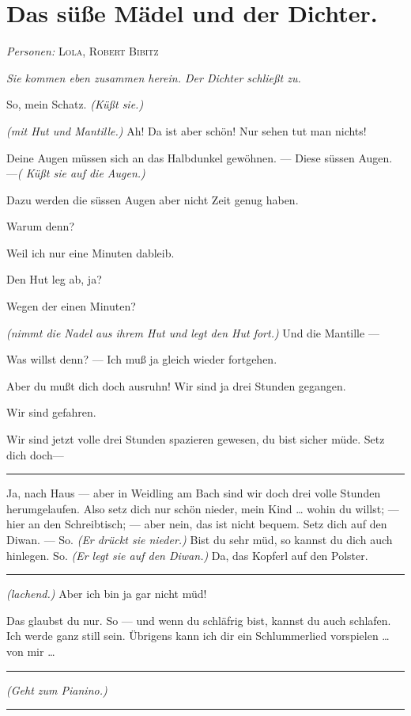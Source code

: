 \documentclass[
	final,
	a4paper,
	ngerman,
	mpinclude = true, %
	twoside = true,
	open = right,
	cleardoublepage = plain,
	DIV = 13,
	BCOR = 1cm,
	titlepage = firstiscover,
	]{scrbook}
\newcommand{\scene}{\section}
\newcommand{\direction}[1]{\textit{(#1)}}
\newcommand{\setting}[1]{\vspace{-0.5\baselineskip}\centering\textit{#1}}
\newenvironment{deletion}{%
		\vspace{0.25\baselineskip}
		\hrule
		\vspace{0.25\baselineskip}
		\color{darkgray}
	}{
		\color{black}
		\vspace{0.25\baselineskip}
		\hrule 
		\vspace{0.25\baselineskip}
	}
\newcommand{\characterlist}[1]{{\begin{center}\textit{Personen:} #1\end{center}}}
\newcommand{\thecharacter}[1]{\textup{\textsc{#1}}\xspace}
\newcommand{\thesuesse}{\thecharacter{Lola}}
\newcommand{\thedichter}{\thecharacter{Robert Bibitz}}
\newcommand{\character}[1]{\item[#1:]}
\newcommand{\suesse}{\character{\thesuesse}}
\newcommand{\dichter}{\character{\thedichter}}
\begin{document}
\scene{Das süße Mädel und der Dichter.}
\characterlist{\thesuesse, \thedichter}
\setting{Sie kommen eben zusammen herein. Der Dichter schließt zu.}
\begin{play}
	\dichter
	So, mein Schatz. \direction{Küßt sie.}

	\suesse
	\direction{mit Hut und Mantille.} Ah! Da ist aber schön! Nur sehen tut man nichts!

	\dichter
	Deine Augen müssen sich an das Halbdunkel gewöhnen. --- Diese süssen Augen. ---\direction{ Küßt sie auf die Augen.}

	\suesse
	Dazu werden die süssen Augen aber nicht Zeit genug haben.

	\dichter
	Warum denn?

	\suesse
	Weil ich nur eine Minuten dableib.

	\dichter
	Den Hut leg ab, ja?

	\suesse
	Wegen der einen Minuten?

	\dichter
	\direction{nimmt die Nadel aus ihrem Hut und legt den Hut fort.} Und die Mantille ---

	\suesse
	Was willst denn? --- Ich muß ja gleich wieder fortgehen.

	\dichter
	Aber du mußt dich doch ausruhn! Wir sind ja drei Stunden gegangen.

	\suesse
	Wir sind gefahren.

	\dichter
	Wir sind jetzt volle drei Stunden spazieren gewesen, du bist sicher müde. Setz dich doch---
	\begin{deletion}
		Ja, nach Haus --- aber in Weidling am Bach sind wir doch drei volle Stunden herumgelaufen. Also setz dich nur schön nieder, mein Kind \ldots{} wohin du willst;
		--- hier an den Schreibtisch; --- aber nein, das ist nicht bequem. Setz dich auf den Diwan. --- So. \direction{Er drückt sie nieder.} Bist du sehr müd, so kannst du dich auch hinlegen. So. \direction{Er legt sie auf den Diwan.} Da, das Kopferl auf den Polster.
	\end{deletion}

	\suesse
	\direction{lachend.} Aber ich bin ja gar nicht müd!

	\dichter
	Das glaubst du nur. So --- und wenn du schläfrig bist, kannst du auch schlafen. Ich werde ganz still sein. Übrigens kann ich dir ein Schlummerlied vorspielen \ldots{} von mir \ldots{}
	\begin{deletion}
		\direction{Geht zum Pianino.}
	\end{deletion}


\end{play}
\end{document}
